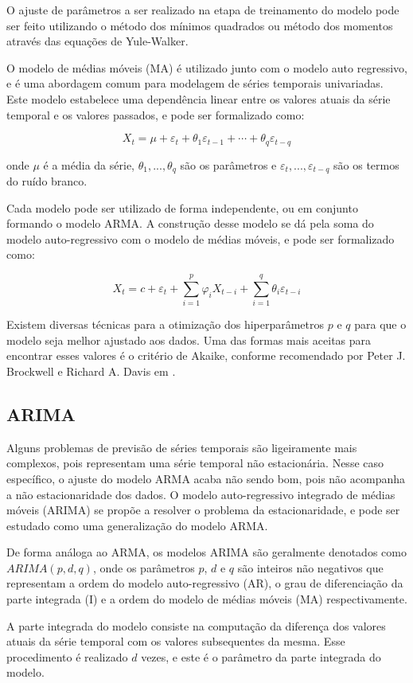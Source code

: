 O ajuste de parâmetros a ser realizado na etapa de treinamento do modelo pode ser feito utilizando o método dos mínimos quadrados ou método dos momentos através das equações de Yule-Walker.

O modelo de médias móveis (MA) é utilizado junto com o modelo auto regressivo, e é uma abordagem comum para modelagem de séries temporais univariadas. Este modelo estabelece uma dependência linear entre os valores atuais da série temporal e os valores passados, e pode ser formalizado como:

\[X_{t}=\mu+\varepsilon_{t}+\theta_{1} \varepsilon_{t-1}+\cdots+\theta_{q} \varepsilon_{t-q}\]

onde $\mu$ é a média da série, $\theta_{1}, ..., \theta_{q}$ são os parâmetros e $\varepsilon_{t}, ..., \varepsilon_{t-q}$ são os termos do ruído branco.

Cada modelo pode ser utilizado de forma independente, ou em conjunto formando o modelo ARMA. A construção desse modelo se dá pela soma do modelo auto-regressivo com o modelo de médias móveis, e pode ser formalizado como:

\[X_{t}=c+\varepsilon_{t}+\sum_{i=1}^{p} \varphi_{i} X_{t-i}+\sum_{i=1}^{q} \theta_{i} \varepsilon_{t-i}\]

Existem diversas técnicas para a otimização dos hiperparâmetros $p$ e $q$ para que o modelo seja melhor ajustado aos dados. Uma das formas mais aceitas para encontrar esses valores é o critério de Akaike, conforme recomendado por Peter J. Brockwell e Richard A. Davis em \cite{akaike}.
\subsection{ARIMA}
Alguns problemas de previsão de séries temporais são ligeiramente mais complexos, pois representam uma série temporal não estacionária. Nesse caso específico, o ajuste do modelo ARMA acaba não sendo bom, pois não acompanha a não estacionaridade dos dados. O modelo auto-regressivo integrado de médias móveis (ARIMA) se propõe a resolver o problema da estacionaridade, e pode ser estudado como uma generalização do modelo ARMA.

De forma análoga ao ARMA, os modelos ARIMA são geralmente denotados como $ARIMA(p, d, q)$, onde os parâmetros $p$, $d$ e $q$ são inteiros não negativos que representam a ordem do modelo auto-regressivo (AR), o grau de diferenciação da parte integrada (I) e a ordem do modelo de médias móveis (MA) respectivamente.

A parte integrada do modelo consiste na computação da diferença dos valores atuais da série temporal com os valores subsequentes da mesma. Esse procedimento é realizado $d$ vezes, e este é o parâmetro da parte integrada do modelo.

